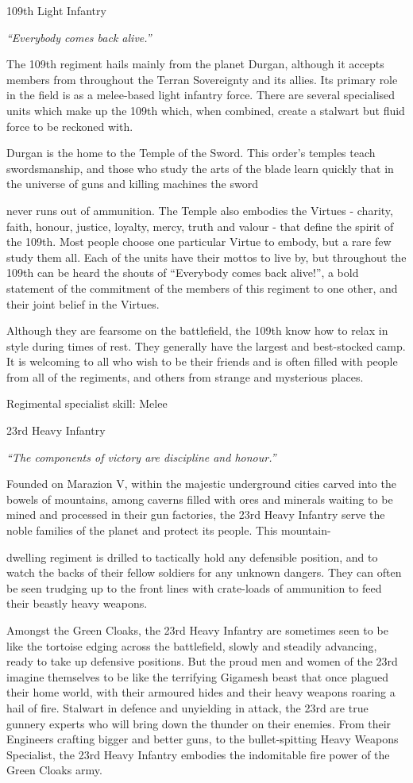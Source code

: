 \documentclass{scrbook}
\begin{document}
109th Light Infantry

\textit{``Everybody comes back alive.''}

The 109th regiment hails mainly from the planet Durgan, although it accepts members from throughout the Terran Sovereignty and its allies. Its primary role in the field is as a melee-based light infantry force. There are several specialised units which make up the 109th which, when combined, create a stalwart but fluid force to be reckoned with.

Durgan is the home to the Temple of the Sword. This order's temples teach swordsmanship, and those who study the arts of the blade learn quickly that in the universe of guns and killing machines the sword

never runs out of ammunition. The Temple also embodies the Virtues - charity, faith, honour, justice, loyalty, mercy, truth and valour - that define the spirit of the 109th. Most people choose one particular Virtue to embody, but a rare few study them all. Each of the units have their mottos to live by, but throughout the 109th can be heard the shouts of ``Everybody comes back alive!'', a bold statement of the commitment of the members of this regiment to one other, and their joint belief in the Virtues.

Although they are fearsome on the battlefield, the 109th know how to relax in style during times of rest. They generally have the largest and best-stocked camp. It is welcoming to all who wish to be their friends and is often filled with people from all of the regiments, and others from strange and mysterious places.

Regimental specialist skill: Melee

23rd Heavy Infantry

\textit{``The components of victory are discipline and honour.''}

Founded on Marazion V, within the majestic underground cities carved into the bowels of mountains, among caverns filled with ores and minerals waiting to be mined and processed in their gun factories, the 23rd Heavy Infantry serve the noble families of the planet and protect its people. This mountain-

dwelling regiment is drilled to tactically hold any defensible position, and to watch the backs of their fellow soldiers for any unknown dangers. They can often be seen trudging up to the front lines with crate-loads of ammunition to feed their beastly heavy weapons.

Amongst the Green Cloaks, the 23rd Heavy Infantry are sometimes seen to be like the tortoise edging across the battlefield, slowly and steadily advancing, ready to take up defensive positions. But the proud men and women of the 23rd imagine themselves to be like the terrifying Gigamesh beast that once plagued their home world, with their armoured hides and their heavy weapons roaring a hail of fire. Stalwart in defence and unyielding in attack, the 23rd are true gunnery experts who will bring down the thunder on their enemies. From their Engineers crafting bigger and better guns, to the bullet-spitting Heavy Weapons Specialist, the 23rd Heavy Infantry embodies the indomitable fire power of the Green Cloaks army.
\end{document}
